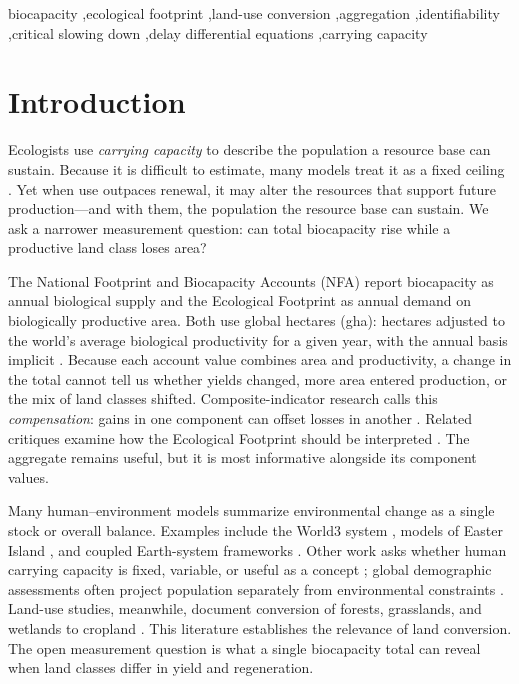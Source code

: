 \documentclass[preprint,12pt,authoryear]{elsarticle}
\begin{document}
\begin{frontmatter}
\begin{keyword}
\footnotesize
biocapacity \sep ecological footprint \sep land-use conversion \sep aggregation \sep identifiability \sep critical slowing down \sep delay differential equations \sep carrying capacity
\end{keyword}

\end{frontmatter}

\section{Introduction}\label{sec:intro}

Ecologists use \emph{carrying capacity} to describe the population a resource base can sustain. Because it is difficult to estimate, many models treat it as a fixed ceiling \citep{Cohen1995}. Yet when use outpaces renewal, it may alter the resources that support future production—and with them, the population the resource base can sustain. We ask a narrower measurement question: can total biocapacity rise while a productive land class loses area?

The National Footprint and Biocapacity Accounts (NFA) report biocapacity as annual biological supply and the Ecological Footprint as annual demand on biologically productive area. Both use global hectares (gha): hectares adjusted to the world's average biological productivity for a given year, with the annual basis implicit \citep{GFNStandards2009,GFNGuidebook2019}. Because each account value combines area and productivity, a change in the total cannot tell us whether yields changed, more area entered production, or the mix of land classes shifted. Composite-indicator research calls this \emph{compensation}: gains in one component can offset losses in another \citep{Nardo2008,Becker2017,Fischer2022}. Related critiques examine how the Ecological Footprint should be interpreted \citep{Blomqvist2013,GiampietroSaltelli2014,vdBerghGrazi2015,Galli2016}. The aggregate remains useful, but it is most informative alongside its component values.

Many human--environment models summarize environmental change as a single stock or overall balance. Examples include the World3 system \citep{Meadows1972,Meadows1974,Meadows2004}, models of Easter Island \citep{BranderTaylor1998,Anderies2000}, and coupled Earth-system frameworks \citep{Motesharrei2016,Donges2017,CalvinBondLamberty2018,HendersonLoreau2018}. Other work asks whether human carrying capacity is fixed, variable, or useful as a concept \citep{Cohen1995,vdBerghRietveld2004,Simon1996,Meyer1994,MeyerAusubel1999,Dasgupta2021}; global demographic assessments often project population separately from environmental constraints \citep{UN2022}. Land-use studies, meanwhile, document conversion of forests, grasslands, and wetlands to cropland \citep{Haberl2007,Krausmann2013,Erb2017}. This literature establishes the relevance of land conversion. The open measurement question is what a single biocapacity total can reveal when land classes differ in yield and regeneration.
\end{document}
